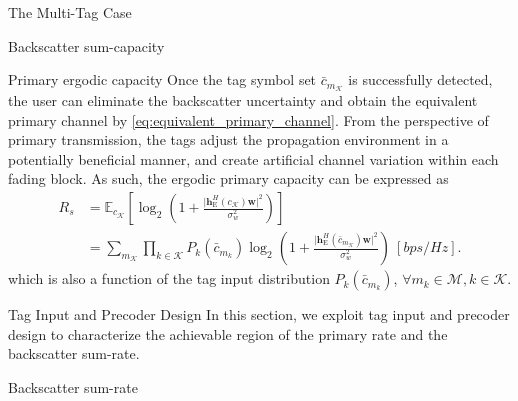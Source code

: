 \documentclass[journal]{IEEEtran}
\begin{document}
\begin{section}{The Multi-Tag Case}
\begin{subsection}{Backscatter sum-capacity}


		\end{subsection}

		\begin{subsection}{Primary ergodic capacity}
			Once the tag symbol set $\bar{c}_{m_{\mathcal{K}}}$ is successfully detected, the user can eliminate the backscatter uncertainty and obtain the equivalent primary channel by \eqref{eq:equivalent_primary_channel}. From the perspective of primary transmission, the tags adjust the propagation environment in a potentially beneficial manner, and create artificial channel variation within each fading block. As such, the ergodic primary capacity can be expressed as
			\begin{align}
				R_s
				& = \mathbb{E}_{c_{\mathcal{K}}} \left[\log_2 \left(1 + \frac{\lvert \boldsymbol{h}_{\mathrm{E}}^H(c_{\mathcal{K}}) \boldsymbol{w} \rvert^2}{\sigma_w^2}\right)\right]\nonumber\\
				& = \sum_{m_{\mathcal{K}}} \prod_{k \in \mathcal{K}} P_k(\bar{c}_{m_k}) \log_2 \left(1 + \frac{\lvert \boldsymbol{h}_{\mathrm{E}}^H(\bar{c}_{m_{\mathcal{K}}}) \boldsymbol{w} \rvert^2}{\sigma_w^2}\right) \ [\si{bps/Hz}].
				\label{eq:primary_rate}
			\end{align}
			which is also a function of the tag input distribution $P_k(\bar{c}_{m_k})$, $\forall m_k \in \mathcal{M}, k \in \mathcal{K}$.
		\end{subsection}
		\label{se:system_model}
	\end{section}

	\begin{section}{Tag Input and Precoder Design}
		In this section, we exploit tag input and precoder design to characterize the achievable region of the primary rate and the backscatter sum-rate.
		\begin{subsection}{Backscatter sum-rate}

		\end{subsection}
	\end{section}
\end{document}
